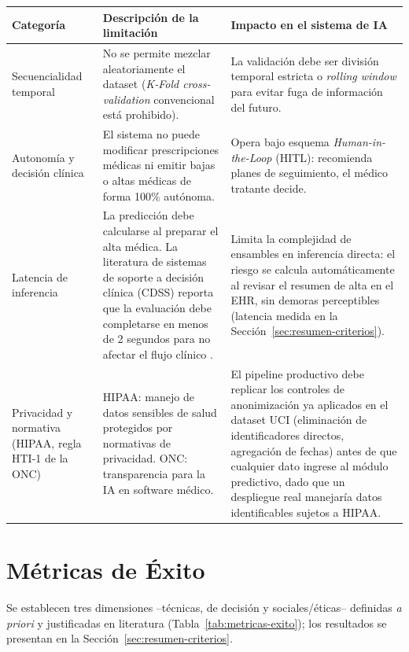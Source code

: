 \documentclass[11pt,a4paper]{article}
\begin{document}
{\small
\begin{longtable}{p{2.3cm}p{6.0cm}p{6.4cm}}
\toprule
\textbf{Categoría} & \textbf{Descripción de la limitación} & \textbf{Impacto en el sistema de IA} \\
\midrule
\endhead
Secuencialidad temporal & No se permite mezclar aleatoriamente el dataset (\emph{K-Fold cross-validation} convencional está prohibido). & La validación debe ser división temporal estricta o \emph{rolling window} para evitar fuga de información del futuro. \\
Autonomía y decisión clínica & El sistema no puede modificar prescripciones médicas ni emitir bajas o altas médicas de forma 100\% autónoma. & Opera bajo esquema \emph{Human-in-the-Loop} (HITL): recomienda planes de seguimiento, el médico tratante decide. \\
Latencia de inferencia & La predicción debe calcularse al preparar el alta médica. La literatura de sistemas de soporte a decisión clínica (CDSS) reporta que la evaluación debe completarse en menos de 2 segundos para no afectar el flujo clínico \cite{nawaz2026}. & Limita la complejidad de ensambles en inferencia directa: el riesgo se calcula automáticamente al revisar el resumen de alta en el EHR, sin demoras perceptibles (latencia medida en la Sección~\ref{sec:resumen-criterios}). \\
Privacidad y normativa (HIPAA, regla HTI-1 de la ONC) & HIPAA: manejo de datos sensibles de salud protegidos por normativas de privacidad. ONC: transparencia para la IA en software médico. & El pipeline productivo debe replicar los controles de anonimización ya aplicados en el dataset UCI (eliminación de identificadores directos, agregación de fechas) antes de que cualquier dato ingrese al módulo predictivo, dado que un despliegue real manejaría datos identificables sujetos a HIPAA. \\
\bottomrule
\end{longtable}}

\section{Métricas de Éxito}

Se establecen tres dimensiones --técnicas, de decisión y sociales/éticas-- definidas \emph{a priori} y justificadas en literatura (Tabla~\ref{tab:metricas-exito}); los resultados se presentan en la Sección~\ref{sec:resumen-criterios}.
\end{document}
